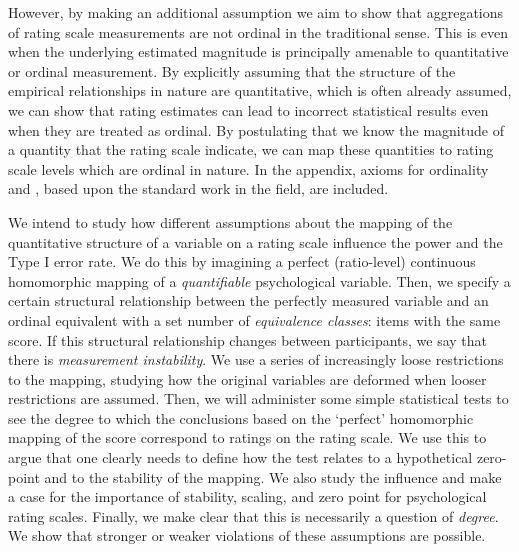 \documentclass[utf8]{FrontiersinVancouver}
\begin{document}
However, by making an additional assumption we aim to show that aggregations of rating scale measurements are not ordinal in the traditional sense. This is even when the underlying estimated magnitude is principally amenable to quantitative or ordinal measurement. By explicitly assuming that the structure of the empirical relationships in nature are quantitative, which is often already assumed, we can show that rating estimates can lead to incorrect statistical results even when they are treated as ordinal.
By postulating that we know the magnitude of a quantity that the rating scale indicate, we can map these quantities to rating scale levels which are ordinal in nature. In the appendix, axioms for ordinality and , based upon the standard work in the field, are included.

We intend to study how different assumptions about the mapping of the quantitative structure of a variable on a rating scale influence the power and the Type I error rate. We do this by imagining a perfect (ratio-level) continuous homomorphic mapping of a \textit{quantifiable} psychological variable. Then, we specify a certain structural relationship between the perfectly measured variable and an ordinal equivalent with a set number of \textit{equivalence classes}: items with the same score. If this structural relationship changes between participants, we say that there is \textit{measurement instability}. We use a series of increasingly loose restrictions to the mapping, studying how the original variables are deformed when looser restrictions are assumed. Then, we will administer some simple statistical tests to see the degree to which the conclusions based on the `perfect' homomorphic mapping of the score correspond to ratings on the rating scale. We use this to argue that one clearly needs to define how the test relates to a hypothetical zero-point and to the stability of the mapping. We also study the influence and make a case for the importance of stability, scaling, and zero point for psychological rating scales. Finally, we make clear that this is necessarily a question of \textit{degree}. We show that stronger or weaker violations of these assumptions are possible.
\end{document}
